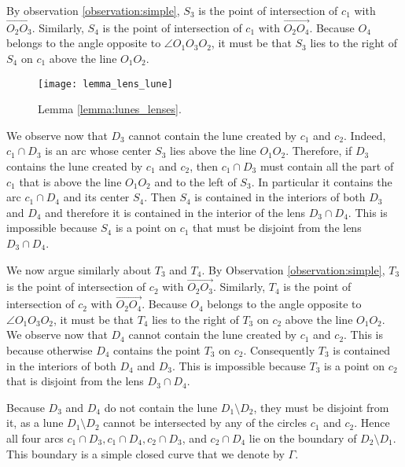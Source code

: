 \documentclass[11pt,a4paper]{article}
\begin{document}
By observation \ref{observation:simple},
$S_{3}$ is the point of intersection of $c_{1}$ with $\overrightarrow{O_{2}O_{3}}$. Similarly, $S_{4}$ is the point of intersection of $c_{1}$ with $\overrightarrow{O_{2}O_{4}}$.
Because $O_{4}$ belongs to the angle opposite to $\angle O_{1}O_{3}O_{2}$, it must be that $S_{3}$ lies to the right of $S_{4}$ on $c_{1}$
above the line $O_{1}O_{2}$.

\begin{figure}[ht]
	\centering
	\texttt{[image: lemma\_lens\_lune]}
	\caption{Lemma \ref{lemma:lunes_lenses}.}
	\label{fig:lemma_lens_lune}
\end{figure}

We observe now that $D_{3}$ cannot contain the lune created by $c_{1}$ and $c_{2}$. 
Indeed, $c_{1} \cap D_{3}$ is an arc whose center $S_{3}$ lies above the line $O_{1}O_{2}$. Therefore, if $D_{3}$ contains the lune created by $c_{1}$ and $c_{2}$, then $c_{1} \cap D_{3}$ must contain all the part of $c_{1}$ that is above the line $O_{1}O_{2}$ and to the left of $S_{3}$. In particular it contains the arc $c_{1} \cap D_{4}$ and its center $S_{4}$.
Then $S_{4}$ is contained in the interiors of both $D_{3}$ and $D_{4}$ and therefore it is contained in the interior of the lens $D_{3} \cap D_{4}$. This is impossible because $S_{4}$ is a point on $c_{1}$ that must be disjoint from the lens $D_{3} \cap D_{4}$.

We now argue similarly about $T_{3}$ and $T_{4}$. By Observation \ref{observation:simple},
$T_{3}$ is the point of intersection of $c_{2}$ with $\overrightarrow{O_{2}O_{3}}$. Similarly, $T_{4}$ is the point of intersection of $c_{2}$ with $\overrightarrow{O_{2}O_{4}}$.
Because $O_{4}$ belongs to the angle opposite to $\angle O_{1}O_{3}O_{2}$, it must be that $T_{4}$ lies to the right of $T_{3}$ on $c_{2}$
above the line $O_{1}O_{2}$.
We observe now that $D_{4}$ cannot contain the lune created by $c_{1}$ and $c_{2}$. This is because 
otherwise $D_{4}$ contains the point $T_{3}$ on $c_{2}$.
Consequently $T_{3}$ is contained in the interiors of both $D_{4}$ and $D_{3}$. This is impossible because $T_{3}$ is a point on $c_{2}$ that is disjoint from the lens $D_{3} \cap D_{4}$.

Because $D_{3}$ and $D_{4}$ do not contain the lune $D_{1} \setminus D_{2}$, they must be disjoint from it, as a lune $D_{1} \setminus D_{2}$ cannot be intersected by any of the circles $c_{1}$ and $c_{2}$. Hence all four arcs $c_{1} \cap D_{3}, c_{1} \cap D_{4}, c_{2} \cap D_{3}$, and $c_{2} \cap D_{4}$
lie on the boundary of
$D_{2} \setminus D_{1}$. This boundary is a simple closed curve that we denote by $\Gamma$.
\end{document}
